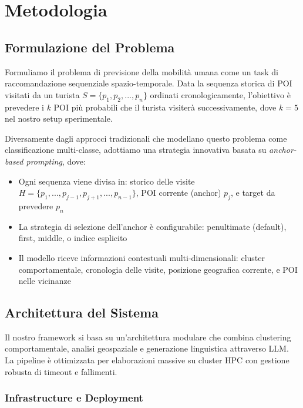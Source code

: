 \section{Metodologia}

\subsection{Formulazione del Problema}

Formuliamo il problema di previsione della mobilità umana come un task di raccomandazione sequenziale spazio-temporale. Data la sequenza storica di POI visitati da un turista $S = \{p_1, p_2, ..., p_n\}$ ordinati cronologicamente, l'obiettivo è prevedere i $k$ POI più probabili che il turista visiterà successivamente, dove $k=5$ nel nostro setup sperimentale.

Diversamente dagli approcci tradizionali che modellano questo problema come classificazione multi-classe, adottiamo una strategia innovativa basata su \textit{anchor-based prompting}, dove:

\begin{itemize}
\item Ogni sequenza viene divisa in: storico delle visite $H = \{p_1, ..., p_{j-1}, p_{j+1}, ..., p_{n-1}\}$, POI corrente (anchor) $p_j$, e target da prevedere $p_n$
\item La strategia di selezione dell'anchor è configurabile: penultimate (default), first, middle, o indice esplicito
\item Il modello riceve informazioni contestuali multi-dimensionali: cluster comportamentale, cronologia delle visite, posizione geografica corrente, e POI nelle vicinanze
\end{itemize}

\subsection{Architettura del Sistema}

Il nostro framework si basa su un'architettura modulare che combina clustering comportamentale, analisi geospaziale e generazione linguistica attraverso LLM. La pipeline è ottimizzata per elaborazioni massive su cluster HPC con gestione robusta di timeout e fallimenti.

\subsubsection{Infrastructure e Deployment}


